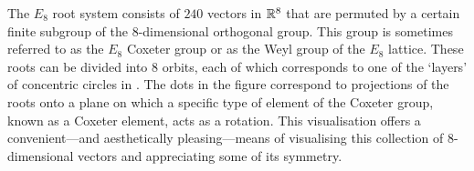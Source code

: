 The $E_8$ root system consists of $240$ vectors in $\mathbb{R}^8$ that are permuted by a certain finite subgroup of the $8$-dimensional orthogonal group. This group is sometimes referred to as the $E_8$ Coxeter group or as the Weyl group of the $E_8$ lattice. These roots can be divided into $8$ orbits, each of which corresponds to one of the `layers' of concentric circles in . The dots in the figure correspond to projections of the roots onto a plane on which a specific type of element of the Coxeter group, known as a Coxeter element, acts as a rotation. This visualisation offers a convenient---and aesthetically pleasing---means of visualising this collection of $8$-dimensional vectors and appreciating some of its symmetry.



